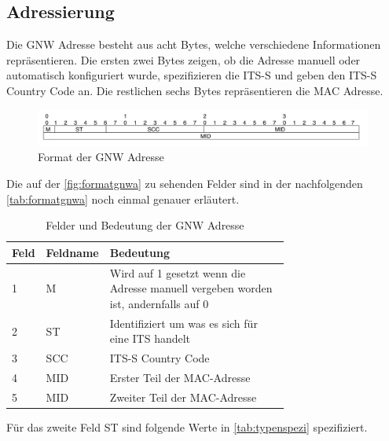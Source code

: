 \subsection{Adressierung} 
Die \acl{GNW} Adresse besteht aus acht Bytes, welche verschiedene Informationen repräsentieren. Die ersten zwei Bytes zeigen, ob die Adresse manuell oder automatisch konfiguriert wurde, spezifizieren die \ac{ITS-S} und geben den ITS-S Country Code an. Die restlichen sechs Bytes repräsentieren die MAC Adresse.\cite{etsi302636-4-1}

\begin{figure}
	\includegraphics[width=0.99\textwidth]{content/images/03_networklayer/gnwadress.jpg}
	\caption{Format der \acl{GNW} Adresse}
	\label{fig:formatgnwa}
\end{figure}
Die auf der \autoref{fig:formatgnwa} zu sehenden Felder sind in der nachfolgenden \autoref{tab:formatgnwa} noch einmal genauer erläutert.

\begin{table}[h]
\begin{tabular}{llp{0.7\linewidth}}
\textbf{Feld} & \textbf{Feldname} & \textbf{Bedeutung} \\ \hline
    1 & M       & Wird auf 1 gesetzt wenn die Adresse manuell vergeben worden ist, andernfalls auf 0          \\
    2 & ST    & Identifiziert um was es sich für eine ITS handelt       \\
    3 & SCC   &   ITS-S Country Code        \\
    4 & MID    &    Erster Teil der MAC-Adresse       \\
    5 & MID     &   Zweiter Teil der MAC-Adresse        \\
\end{tabular}
\caption{Felder und Bedeutung der \acs{GNW} Adresse \cite{etsi302636-4-1}}
\label{tab:formatgnwa}
\end{table}

Für das zweite Feld ST sind folgende Werte in \autoref{tab:typenspezi} spezifiziert.

